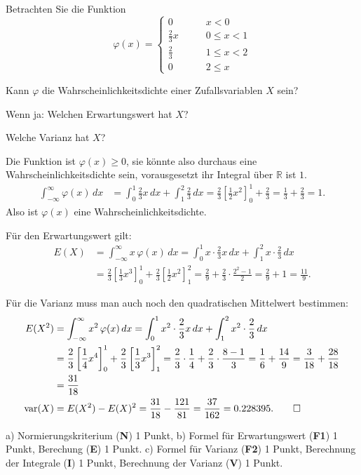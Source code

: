 Betrachten Sie die Funktion
\[
\varphi(x)=\begin{cases}
0&\qquad x < 0\\
\frac23x&\qquad 0\le x< 1\\
\frac23&\qquad 1\le x< 2\\
0&\qquad 2\le x
\end{cases}
\]
\begin{teilaufgaben}
\item Kann $\varphi$ die Wahrscheinlichkeitsdichte einer Zufallsvariablen
$X$ sein?
\item Wenn ja: Welchen Erwartungswert hat $X$?
\item Welche Varianz hat $X$?
\end{teilaufgaben}

\begin{loesung}
\begin{teilaufgaben}
\item Die Funktion ist $\varphi(x)\ge 0$, sie könnte also durchaus
eine Wahrscheinlichkeitsdichte sein, vorausgesetzt ihr Integral über
$\mathbb R$ ist $1$.
\begin{align*}
\int_{-\infty}^{\infty}\varphi(x)\,dx
&=
\int_0^1\frac23x\,dx
+\int_1^2\frac23\,dx
=\frac23\left[
\frac12x^2
\right]_0^1
+\frac23
=\frac13+\frac23=1.
\end{align*}
Also ist $\varphi(x)$ eine Wahrscheinlichkeitsdichte.
\item Für den Erwartungswert gilt:
\begin{align*}
E(X)
&=\int_{-\infty}^{\infty}x\,\varphi(x)\,dx
=
\int_0^1 x\cdot \frac23x\,dx + \int_1^2x\cdot \frac23\,dx
\\
&=
\frac23\left[ \frac13x^3 \right]_0^1 + \frac23\left[ \frac12x^2 \right]_1^2
=\frac29 + \frac23\cdot\frac{2^2-1}2
=\frac29 + 1=\frac{11}9.
\end{align*}
\item Für die Varianz muss man auch noch den quadratischen Mittelwert
bestimmen:
\begin{align*}
E(X^2)
&=
\int_{-\infty}^{\infty}x^2\,\varphi(x)\,dx
=
\int_0^1 x^2\cdot \frac23x\,dx + \int_1^2x^2\cdot \frac23\,dx
\\
&=
\frac23 \left[ \frac14 x^4 \right]_0^1
+\frac23 \left[ \frac13 x^3 \right]_1^2
=\frac23\cdot\frac14+\frac23\cdot\frac{8-1}3
=\frac16+\frac{14}9=\frac3{18}+\frac{28}{18}
\\
&=\frac{31}{18}
\\
\operatorname{var}(X)
&=
E(X^2)-E(X)^2
=\frac{31}{18}-\frac{121}{81}
=\frac{37}{162}
=0.228395.
\qedhere
\end{align*}
\end{teilaufgaben}
\end{loesung}

\begin{bewertung}
a) Normierungskriterium ({\bf N}) 1 Punkt,
b) Formel für Erwartungswert ({\bf F1}) 1 Punkt, Berechung ({\bf E}) 1 Punkt.
c) Formel für Varianz ({\bf F2}) 1 Punkt, Berechnung der Integrale ({\bf I})
1 Punkt, Berechnung der Varianz ({\bf V}) 1 Punkt.
\end{bewertung}
